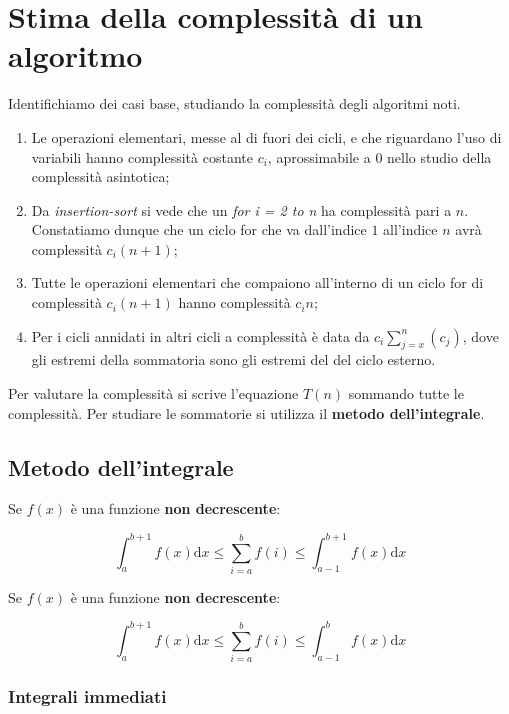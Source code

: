 \section{Stima della complessità di un algoritmo}

Identifichiamo dei casi base, studiando la complessità degli algoritmi noti.

\begin{enumerate}

\item Le operazioni elementari, messe al di fuori dei cicli, e che riguardano l'uso di variabili hanno complessità costante $c_i$, aprossimabile a 0 nello studio della complessità asintotica;

\item Da \textit{insertion-sort} si vede che un \textit{for i = 2 to n} ha complessità pari a $n$. Constatiamo dunque che un ciclo for che va dall'indice $1$ all'indice $n$ avrà complessità $c_i(n+1)$;

\item Tutte le operazioni elementari che compaiono all'interno di un ciclo for di complessità $c_i(n+1)$ hanno complessità $c_in$;

\item Per i cicli annidati in altri cicli a complessità è data da $c_i\sum_{j=x}^{n}(c_j)$, dove gli estremi della sommatoria sono gli estremi del del ciclo esterno.

\end{enumerate}

Per valutare la complessità si scrive l'equazione $T(n)$ sommando tutte le complessità. Per studiare le sommatorie si utilizza il \textbf{metodo dell'integrale}.

\subsection{Metodo dell'integrale}

Se $f(x)$ è una funzione \textbf{non decrescente}:

$$\int_a^{b+1} f(x)\mathrm{d}x\le \sum_{i=a}^b f(i) \le \int_{a-1}^{b+1} f(x)\mathrm{d}x$$

Se $f(x)$ è una funzione \textbf{non decrescente}:

$$\int_a^{b+1} f(x)\mathrm{d}x \le \sum_{i=a}^b f(i) \le \int_{a-1}^b f(x)\mathrm{d}x$$

\subsubsection{Integrali immediati}

